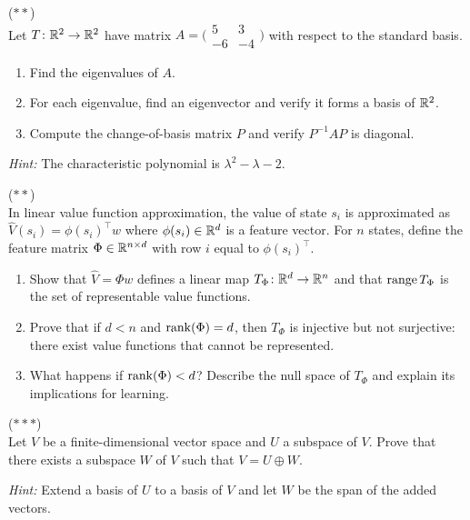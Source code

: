 \documentclass[11pt,a4paper]{article}
\begin{document}
\begin{exercise}
\label{ex:change_basis}
\textnormal{(\(**\))} \\
Let $T\colon \mathbb{R}^2 \to \mathbb{R}^2$ have matrix
$A = \bigl(\begin{smallmatrix} 5 & 3 \\ -6 & -4 \end{smallmatrix}\bigr)$
with respect to the standard basis.
\begin{enumerate}[nosep,label=(\alph*)]
  \item Find the eigenvalues of $A$.
  \item For each eigenvalue, find an eigenvector and verify it forms a basis
        of $\mathbb{R}^2$.
  \item Compute the change-of-basis matrix $P$ and verify
        $P^{-1}AP$ is diagonal.
\end{enumerate}
\textit{Hint:} The characteristic polynomial is $\lambda^2 - \lambda - 2$.
\end{exercise}

\begin{exercise}
\label{ex:feature_rank}
\textnormal{(\(**\))} \\
In linear value function approximation, the value of state $s_i$ is
approximated as $\hat{V}(s_i) = \phi(s_i)^\top w$ where
$\phi(s_i) \in \mathbb{R}^d$ is a feature vector.  For $n$ states, define the
feature matrix $\Phi \in \mathbb{R}^{n \times d}$ with row $i$ equal to
$\phi(s_i)^\top$.
\begin{enumerate}[nosep,label=(\alph*)]
  \item Show that $\hat{V} = \Phi w$ defines a linear map
        $T_\Phi\colon \mathbb{R}^d \to \mathbb{R}^n$ and that $\operatorname{range} T_\Phi$ is the set of
        representable value functions.
  \item Prove that if $d < n$ and $\operatorname{rank}(\Phi) = d$, then $T_\Phi$ is
        injective but not surjective: there exist value functions that
        cannot be represented.
  \item What happens if $\operatorname{rank}(\Phi) < d$?  Describe the null space of
        $T_\Phi$ and explain its implications for learning.
\end{enumerate}
\end{exercise}

\begin{exercise}
\label{ex:direct_sum_proof}
\textnormal{(\(***\))} \\
Let $V$ be a finite-dimensional vector space and $U$ a subspace of $V$.
Prove that there exists a subspace $W$ of $V$ such that $V = U \oplus W$.

\textit{Hint:} Extend a basis of $U$ to a basis of $V$ and let $W$ be the
span of the added vectors.
\end{exercise}
\end{document}
